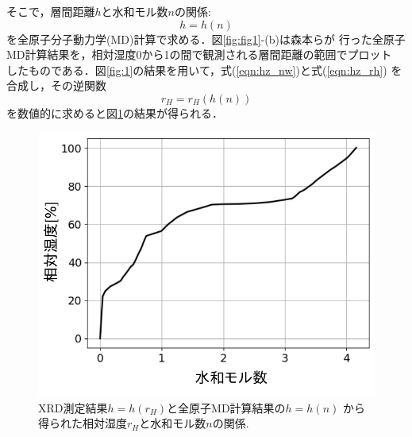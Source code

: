 そこで，層間距離$h$と水和モル数\(n\)の関係:
\begin{equation}
	h=h(n)
	\label{eqn:hz_nw}
\end{equation}
を全原子分子動力学(MD)計算で求める．図\ref{fig:fig1}-(b)は森本ら\cite{Morimoto}が
行った全原子MD計算結果を，相対湿度0から1の間で観測される層間距離の範囲でプロット
したものである．図\ref{fig:1}の結果を用いて，式(\ref{eqn:hz_nw})と式(\ref{eqn:hz_rh})
を合成し，その逆関数
\begin{equation}
	r_H=r_H(h(n))
	\label{eqn:rh_nw}
\end{equation}
を数値的に求めると図\ref{fig:fig6}の結果が得られる．
\begin{figure}[h]
	\begin{center}
	\includegraphics[width=0.6\linewidth]{Figs/fig6.pdf} 
	\end{center}
	\caption{
		XRD測定結果\(h=h(r_H)\)と全原子MD計算結果の\(h=h(n)\)
		から得られた相対湿度$r_H$と水和モル数$n$の関係.
	} 
	\label{fig:fig6}
\end{figure}
